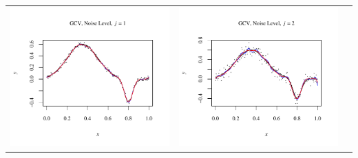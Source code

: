 \documentclass[11pt]{article}
\begin{document}
\begin{table}[h!]
  \begin{center}
    \renewcommand{\arraystretch}{1.5}
    \begin{tabular}{| >{\centering\arraybackslash}m{2.1in} |  >{\centering\arraybackslash}m{2.1in} |  >{\centering\arraybackslash}m{2.1in}|}
      \hline
      \includegraphics[width=1\linewidth,height=0.18\textheight]{Graphs/2/1/assignment5_a_2_1_1}&
      \includegraphics[width=1\linewidth,height=0.18\textheight]{Graphs/2/1/assignment5_a_2_1_2}&

\end{tabular}
\end{center}
\end{table}
\end{document}
